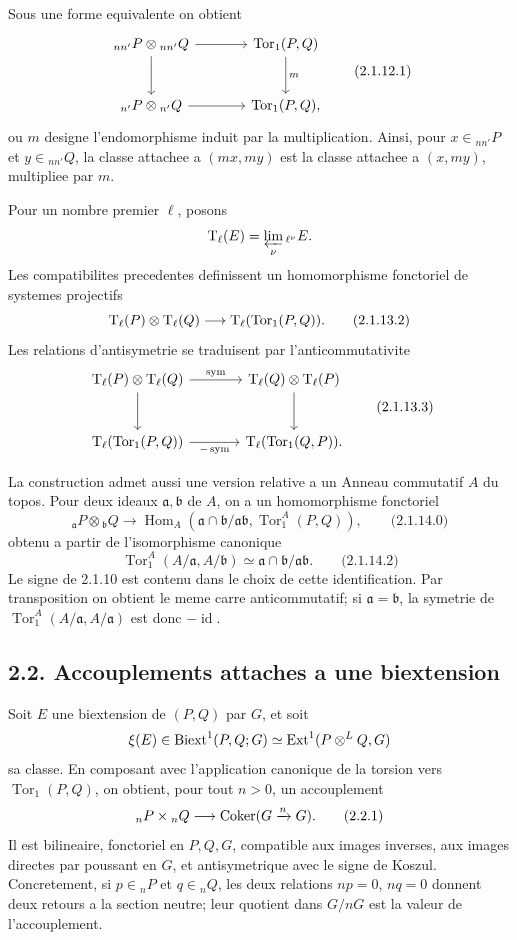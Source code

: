 \documentclass[11pt]{article}
\providecommand{\Tor}{\operatorname{Tor}}
\providecommand{\Hom}{\operatorname{Hom}}
\providecommand{\Ext}{\operatorname{Ext}}
\providecommand{\id}{\operatorname{id}}
\begin{document}
Sous une forme equivalente on obtient
\[
\begin{tikzcd}[column sep=large,row sep=large]
 {}_{nn'}P\otimes {}_{nn'}Q \arrow[r]\arrow[d] & \Tor_1(P,Q)\arrow[d,"m"]\\
 {}_{n'}P\otimes {}_{n'}Q \arrow[r] & \Tor_1(P,Q),
\end{tikzcd}
\qquad\text{(2.1.12.1)}
\]
ou \(m\) designe l'endomorphisme induit par la multiplication.  Ainsi, pour \(x\in{}_{nn'}P\) et \(y\in{}_{nn'}Q\), la classe attachee a \((mx,my)\) est la classe attachee a \((x,my)\), multipliee par \(m\).

Pour un nombre premier \(\ell\), posons
\[
        \mathrm T_\ell(E)=\varprojlim_\nu {}_{\ell^\nu}E.
\]
Les compatibilites precedentes definissent un homomorphisme fonctoriel de systemes projectifs
\[
        \Tate_\ell(P)\otimes \Tate_\ell(Q)
        \longrightarrow \Tate_\ell(\Tor_1(P,Q)).
\qquad\text{(2.1.13.2)}
\]
Les relations d'antisymetrie se traduisent par l'anticommutativite
\[
\begin{tikzcd}[column sep=large,row sep=large]
 \Tate_\ell(P)\otimes \Tate_\ell(Q) \arrow[r,"\mathrm{sym}"]\arrow[d] &
 \Tate_\ell(Q)\otimes \Tate_\ell(P)\arrow[d]\\
 \Tate_\ell(\Tor_1(P,Q))\arrow[r,"-\,\mathrm{sym}"'] &
 \Tate_\ell(\Tor_1(Q,P)).
\end{tikzcd}
\qquad\text{(2.1.13.3)}
\]

La construction admet aussi une version relative a un Anneau commutatif \(A\) du topos.  Pour deux ideaux \(\mathfrak a,\mathfrak b\) de \(A\), on a un homomorphisme fonctoriel
\[
        {}_{\mathfrak a}P\otimes {}_{\mathfrak b}Q
        \longrightarrow
        \Hom_A(\mathfrak a\cap\mathfrak b/\mathfrak a\mathfrak b,\Tor_1^A(P,Q)),
\qquad\text{(2.1.14.0)}
\]
obtenu a partir de l'isomorphisme canonique
\[
        \Tor_1^A(A/\mathfrak a,A/\mathfrak b)
        \simeq \mathfrak a\cap\mathfrak b/\mathfrak a\mathfrak b.
\qquad\text{(2.1.14.2)}
\]
Le signe de 2.1.10 est contenu dans le choix de cette identification.  Par transposition on obtient le meme carre anticommutatif; si \(\mathfrak a=\mathfrak b\), la symetrie de \(\Tor_1^A(A/\mathfrak a,A/\mathfrak a)\) est donc \(-\id\).

\subsection*{2.2. Accouplements attaches a une biextension}

Soit \(E\) une biextension de \((P,Q)\) par \(G\), et soit
\[
        \xi(E)\in \Biext^1(P,Q;G)\simeq \Ext^1(P\otimes^L Q,G)
\]
sa classe.  En composant avec l'application canonique de la torsion vers \(\Tor_1(P,Q)\), on obtient, pour tout \(n>0\), un accouplement
\[
        {}_nP\times {}_nQ\longrightarrow \operatorname{Coker}(G\xrightarrow{n}G).
\qquad\text{(2.2.1)}
\]
Il est bilineaire, fonctoriel en \(P,Q,G\), compatible aux images inverses, aux images directes par poussant en \(G\), et antisymetrique avec le signe de Koszul.  Concretement, si \(p\in{}_nP\) et \(q\in{}_nQ\), les deux relations \(np=0\), \(nq=0\) donnent deux retours a la section neutre; leur quotient dans \(G/nG\) est la valeur de l'accouplement.
\end{document}
